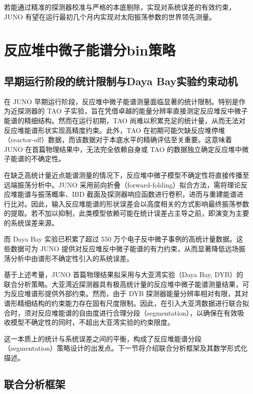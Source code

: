 若能通过精准的探测器校准与严格的本底剔除，实现对系统误差的有效约束，JUNO 有望在运行最初几个月内实现对太阳振荡参数的世界领先测量。

\section{反应堆中微子能谱分bin策略}
\label{sec:reactor_binning}

\subsection{早期运行阶段的统计限制与Daya Bay实验约束动机}

在 JUNO 早期运行阶段，反应堆中微子能谱测量面临显著的统计限制。特别是作为近探测器的 TAO 子实验，旨在凭借卓越的能量分辨率直接测定反应堆反中微子能谱的精细结构。然而在运行初期，TAO 尚难以积累充足的统计量，从而无法对反应堆能谱形状实现高精度约束。此外，TAO 在初期可能欠缺反应堆停堆（reactor-off）数据，而该数据对于本底水平的精确评估至关重要。这意味着 JUNO 在首篇物理结果中，无法完全依赖自身或 TAO 的数据独立确定反应堆中微子能谱的不确定性。

在缺乏高统计量近点能谱测量的情况下，反应堆中微子模型不确定性将直接传播至远端振荡分析中。JUNO 采用前向折叠（forward-folding）拟合方法，需将理论反应堆能谱与振荡概率、IBD 截面及探测器响应函数进行卷积，进而与重建能谱进行比对。因此，输入反应堆能谱的形状误差会以高度相关的方式影响最终振荡参数的提取。若不加以抑制，此类模型依赖可能在统计误差占主导之前，即演变为主要的系统误差来源。

而 Daya Bay 实验已积累了超过 550 万个电子反中微子事例的高统计量数据。这些数据可为 JUNO 提供对反应堆反中微子能谱的有力约束，从而显著降低远场振荡分析中由谱形不确定性引入的系统误差。

基于上述考量，JUNO 首篇物理结果拟采用与大亚湾实验（Daya Bay, DYB）\cite{PhysRevLett.134.201802}的联合分析策略。大亚湾近探测器具有极高统计量的反应堆中微子能谱测量结果，可为反应堆谱形提供外部约束。然而，由于 DYB 探测器能量分辨率相对有限，其对谱形精细结构的约束能力存在固有尺度限制。因此，在引入大亚湾数据进行联合拟合时，须对反应堆能谱的自由度进行合理分段（segmentation），以确保在有效吸收模型不确定性的同时，不超出大亚湾实验的约束限度。

这一本质上的统计与系统误差之间的平衡，构成了反应堆能谱分段（segmentation）策略设计的出发点。下一节将介绍联合分析框架及其数学形式化描述。

\subsection{联合分析框架}

